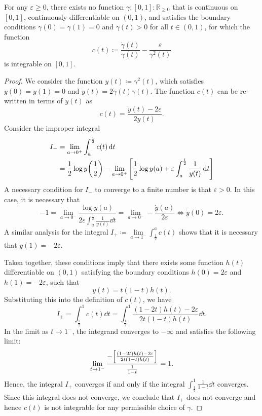\begin{lemma}
  For any \(\varepsilon \geq 0\), there exists no function \(\gamma : [0, 1] : \mathbb{R}_{\geq 0}\) that is continuous on \([0,1]\), continuously differentiable on \((0, 1)\), and satisfies the boundary conditions \(\gamma(0) = \gamma(1) = 0\) and \(\gamma(t) > 0\) for all \(t \in (0, 1)\), for which the function
  \[
    c(t) \coloneqq \frac{\dot{\gamma}(t)}{\gamma(t)} - \frac{\varepsilon}{\gamma^{2}(t)}
  \]
  is integrable on \([0, 1]\).
\end{lemma}
\begin{proof}
  We consider the function \(y(t) \coloneqq \gamma^{2}(t)\), which satisfies \(y(0) =y(1) = 0\) and \(\dot{y}(t) = 2 \dot{\gamma}(t) \gamma(t)\). The function \(c(t)\) can be re-written in terms of \(y(t)\) as
  \[
    c(t) = \frac{ \dot{y}(t) - 2\varepsilon}{2y(t)}.
  \]
  Consider the improper integral
  \begin{align*}
    I_{-} &= \lim\limits_{a \to 0^{+}} \int_{a}^{\frac{1}{2}} c(t) \dd{t} \\
    &= \frac{1}{2} \log y\qty(\frac{1}{2}) - \lim\limits_{a \to 0^{+}} \qty[\frac{1}{2} \log y(a) + \varepsilon \int_{a}^{\frac{1}{2}} \frac{1}{y(t)} \dd{t}]
  \end{align*}
  A necessary condition for \(I_{-}\) to converge to a finite number is that \(\varepsilon > 0\). In this case, it is necessary that
  \[
    -1 = \lim\limits_{a \to 0^{-}} \frac{\log y(a)}{2 \varepsilon \int_{a}^{\frac{1}{2}} \frac{1}{y(t)} \dd{t}} = \lim\limits_{a \to 0^{-}} -\frac{\dot{y}(a)}{ 2 \varepsilon} \iff \dot{y}(0) = 2\varepsilon.
  \]
  A similar analysis for the integral \(I_{+} \coloneqq \lim\limits_{a \to 1^{-}} \int_{\frac{1}{2}}^{a} c(t)\) shows that it is necessary that \(\dot{y}(1) = -2\varepsilon\).

  Taken together, these conditions imply that there exists some function \(h(t)\) differentiable on \((0, 1)\) satisfying the boundary conditions \(h(0) = 2\varepsilon\) and \(h(1) = -2\varepsilon\), such that
  \[
    y(t) =  t(1-t) h(t).
  \]
  Substituting this into the definition of \(c(t)\), we have
  \[
    I_{+} = \int_{\frac{1}{2}}^{1} c(t)\dd{t}= \int_{\frac{1}{2}}^{1} \frac{(1 - 2t) h(t) - 2\varepsilon}{2t(1-t) h(t)}\dd{t}.
  \]
  In the limit as \(t \to 1^{-}\), the integrand converges to \(-\infty\) and satisfies the following limit:
  \[
    \lim\limits_{t \to 1^{-}}  \frac{-\qty[\frac{(1-2t) h(t) - 2\varepsilon}{2t(1-t) h(t)}]}{\frac{1}{1-t}} = 1.
  \]
  Hence, the integral \(I_{+}\) converges if and only if the integral \(\int_{\frac{1}{2}}^{1} \frac{1}{1-t} \dd{t}\) converges. Since this integral does not converge, we conclude that \(I_{+}\) does not converge and hence \(c(t)\) is not integrable for any permissible choice of \(\gamma\).
\end{proof}

